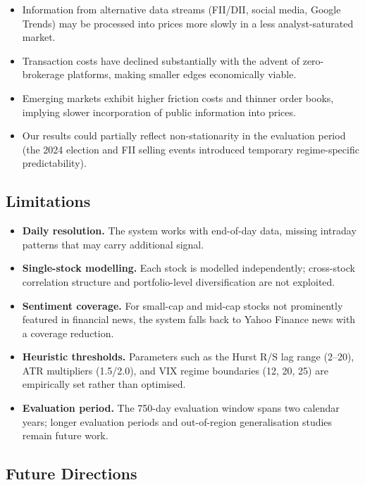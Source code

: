 \documentclass[10pt,a4paper,twoside]{article}
\begin{document}
\begin{itemize}
\item Information from alternative data streams (FII/DII, social media,
  Google Trends) may be processed into prices more slowly in a less
  analyst-saturated market.
\item Transaction costs have declined substantially with the advent of
  zero-brokerage platforms, making smaller edges economically viable.
\item Emerging markets exhibit higher friction costs and thinner order books,
  implying slower incorporation of public information into prices.
\item Our results could partially reflect non-stationarity in the evaluation
  period (the 2024 election and FII selling events introduced temporary
  regime-specific predictability).
\end{itemize}

\subsection{Limitations}

\begin{itemize}
\item \textbf{Daily resolution.} The system works with end-of-day data,
  missing intraday patterns that may carry additional signal.
\item \textbf{Single-stock modelling.} Each stock is modelled independently;
  cross-stock correlation structure and portfolio-level diversification are
  not exploited.
\item \textbf{Sentiment coverage.} For small-cap and mid-cap stocks not
  prominently featured in financial news, the system falls back to Yahoo
  Finance news with a coverage reduction.
\item \textbf{Heuristic thresholds.} Parameters such as the Hurst R/S lag
  range (2--20), ATR multipliers (1.5/2.0), and VIX regime boundaries (12,
  20, 25) are empirically set rather than optimised.
\item \textbf{Evaluation period.} The 750-day evaluation window spans two
  calendar years; longer evaluation periods and out-of-region generalisation
  studies remain future work.
\end{itemize}

\subsection{Future Directions}
\end{document}
